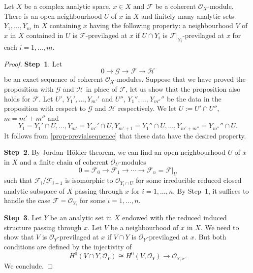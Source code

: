 \begin{proposition}\label{prop-previasmallnei}
    Let $X$ be a complex analytic space, $x\in X$ and $\mathcal{F}$ be a coherent $\mathcal{O}_X$-module. There is an open neighbourhood $U$ of $x$ in $X$ and finitely many analytic sets $Y_1,\ldots,Y_m$ in $X$ containing $x$ having the following property: a neighbourhood $V$ of $x$ in $X$ contained in $U$ is $\mathcal{F}$-previlaged at $x$ if $U\cap Y_i$ is $\mathcal{F}|_{Y_i}$-previlaged at $x$ for each $i=1,\ldots,m$. 
\end{proposition}
\begin{proof}
    \textbf{Step~1}. Let 
    \[
        0\rightarrow \mathcal{G}\rightarrow \mathcal{F}\rightarrow \mathcal{H}
    \]
    be an exact sequence of coherent $\mathcal{O}_X$-modules. Suppose that we have proved the proposition with $\mathcal{G}$ and $\mathcal{H}$ in place of $\mathcal{F}$, let us show that the proposition also holds for $\mathcal{F}$. Let $U'$, $Y_1',\ldots,Y_{m'}'$ and $U''$, $Y_1'',\ldots,Y_{m''}''$ be the data in the proposition with respect to $\mathcal{G}$ and $\mathcal{H}$ respectively. We let $U:=U'\cap U''$, $m=m'+m''$ and
    \[
        Y_1=Y_1'\cap U,\ldots,Y_{m'}=Y_{m'}'\cap U, Y_{m'+1}=Y_{1}''\cap U,\ldots,Y_{m'+m''}=Y_{m''}''\cap U.  
    \]
    It follows from \cref{prop-previalsequence} that these data have the desired property.

    \textbf{Step~2}. By Jordan--Hölder theorem, we can find an open neighbourhood $U$ of $x$ in $X$ and a finite chain of coherent $\mathcal{O}_U$-modules 
    \[
        0=\mathcal{F}_0\rightarrow \mathcal{F}_1\rightarrow \cdots \rightarrow \mathcal{F}_n=\mathcal{F}|_U  
    \]
    such that $\mathcal{F}_{i}/\mathcal{F}_{i-1}$ is isomorphic to $\mathcal{O}_{Y_i\cap U}$ for some irreducible reduced closed analytic subspace of $X$ passing through $x$ for $i=1,\ldots,n$. By Step~1, it suffices to handle the case $\mathcal{F}=\mathcal{O}_{Y_i}$ for some $i=1,\ldots,n$. 
    
    \textbf{Step~3}. Let $Y$ be an analytic set in $X$ endowed with the reduced induced structure passing through $x$. Let $V$ be a neighbourhood of $x$ in $X$. We need to show that $V$ is $\mathcal{O}_Y$-previlaged at $x$ if $V\cap Y$ is $\mathcal{O}_{Y}$-previlaged at $x$.
    But both conditions are defined by the injectivity of
    \[
        H^0(V\cap Y,\mathcal{O}_{Y})\cong H^0(V,\mathcal{O}_Y)\rightarrow \mathcal{O}_{Y,x}.     
    \]
    We conclude.
\end{proof}

